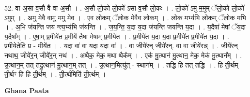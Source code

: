 \documentclass[17pt]{extarticle}
\begin{document}
52. वा अ॒सा व॒सौ वै वा अ॒सौ । . अ॒सौ लो॒को लो॒को॑ ऽसा व॒सौ लो॒कः । . लो॒को॑ ऽमु म॒मुम् ॅलो॒को लो॒को॑ ऽमुम् । . अ॒मु मे॒वै वामु म॒मु मे॒व । . ए॒व लो॒कम् ॅलो॒क मे॒वैव लो॒कम् । . लो॒क म॒भ्य॑भि लो॒कम् ॅलो॒क म॒भि । . अ॒भि ज॑यन्ति जय न्त्य॒भ्य॑भि ज॑यन्ति । . ज॒य॒न्ति॒ य॒दा य॒दा ज॑यन्ति जयन्ति य॒दा । . य॒दैषा॑ मेषां ॅय॒दा य॒दैषा᳚म् । . ए॒षा॒म् प्र॒मीये॑त प्र॒मीये॑ तैषा मेषाम् प्र॒मीये॑त । . प्र॒मीये॑त य॒दा य॒दा प्र॒मीये॑त प्र॒मीये॑त य॒दा । . प्र॒मीये॒तेति॑ प्र - मीये॑त । . य॒दा वा॑ वा य॒दा य॒दा वा᳚ । . वा॒ जीये॑र॒न् जीये॑रन्. वा वा॒ जीये॑रन्न् । . जीये॑र॒न् नथाथ॒ जीये॑र॒न् जीये॑र॒न् नथ॑ । . अथैक॒ मेक॒ मथा थैक᳚म् । . एक॑ मु॒त्थान॑ मु॒त्थान॒ मेक॒ मेक॑ मु॒त्थान᳚म् । . उ॒त्थान॒म् तत् तदु॒त्थान॑ मु॒त्थान॒म् तत् । . उ॒त्थान॒मित्यु॑त् - स्थान᳚म् । . तद्धि हि तत् तद्धि । . हि ती॒र्थम् ती॒र्थꣳ हि हि ती॒र्थम् । . ती॒र्त्थमिति॑ ती॒र्त्थम् । \newline

\textbf{Ghana Paata } \newline
\end{document}
